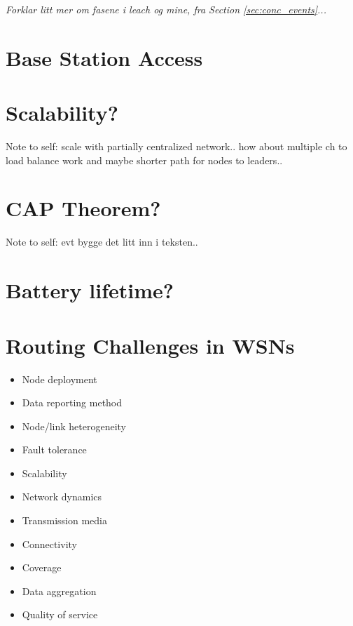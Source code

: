\documentclass[USenglish]{uit-thesis}
\begin{document}
\textit{Forklar litt mer om fasene i \gls{leach} og mine, fra Section \ref{sec:conc_events}...}



\section{Base Station Access}

\section{Scalability?}
Note to self: scale with partially centralized network.. how about multiple \gls{ch} to load balance work and maybe shorter path for nodes to leaders..

\section{CAP Theorem?}
Note to self: evt bygge det litt inn i teksten..

\section{Battery lifetime?}

\section{Routing Challenges in WSNs}
\begin{itemize}
\item Node deployment
\item Data reporting method
\item Node/link heterogeneity
\item Fault tolerance
\item Scalability
\item Network dynamics
\item Transmission media
\item Connectivity
\item Coverage
\item Data aggregation
\item Quality of service
\end{itemize}
\end{document}
